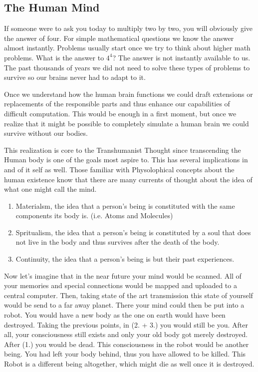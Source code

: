 \documentclass[
      12pt,
      a4paper,
      cleardoublepage=empty,
      final,
      twoside
        ]{scrbook}
\begin{document}
    \subsection{The Human Mind}
      \begin{par}
        If someone were to ask you today to multiply two by two, you will obviously give the answer of four. 
        For simple mathematical questions we know the answer almost instantly. Problems usually start once we try to think about higher math problems. 
        What is the answer to $4^4$? The answer is not instantly available to us. 
        The past thousands of years we did not need to solve these types of problems to survive so our brains never had to adapt to it.
      \end{par}
      \begin{par}
        Once we understand how the human brain functions we could draft extensions or replacements of the responsible parts and thus enhance our capabilities of difficult computation. 
        This would be enough in a first moment, but once we realize that it might be possible to completely simulate a human brain we could survive without our bodies.\cite{FutureMinds}
      \end{par}
      \begin{par}
        This realization is core to the Transhumanist Thought since transcending the Human body is one of the goals most aspire to. 
        This has several implications in and of it self as well. 
        Those familiar with Physolophical concepts about the human existence know that there are many currents of thought about the idea of what one might call the mind. 
      \end{par}
      \begin{enumerate}
        \item Materialsm, the idea that a person's being is constituted with the same components its body is. (i.e. Atoms and Molecules)
        \item Spritualism, the idea that a person's being is constituted by a soul that does not live in the body and thus survives after the death of the body.
        \item Continuity, the idea that a person's being is but their past experiences. 
      \end{enumerate}
      \begin{par}
        Now let's imagine that in the near future your mind would be scanned. 
        All of your memories and special connections would be mapped and uploaded to a central computer. 
        Then, taking state of the art transmission this state of yourself would be send to a far away planet. 
        There your mind could then be put into a robot. You would have a new body as the one on earth would have been destroyed. 
        Taking the previous points, in (2. + 3.) you would still be you. After all, your consciousness still exists and only your old body got merely destroyed. 
        After (1.) you would be dead. This consciousness in the robot would be another being. 
        You had left your body behind, thus you have allowed to be killed. 
        This Robot is a different being altogether, which might die as well once it is destroyed.
      \end{par}
\end{document}
